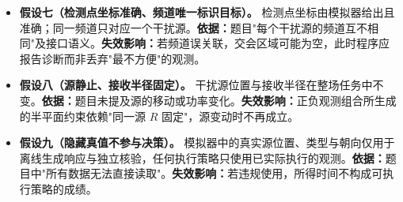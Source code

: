 \begin{itemize}[label=\textbullet,leftmargin=2em]
  \item \textbf{假设七（检测点坐标准确、频道唯一标识目标）。} 检测点坐标由模拟器给出且准确；同一频道只对应一个干扰源。\textbf{依据：}题目"每个干扰源的频道互不相同"及接口语义。\textbf{失效影响：}若频道误关联，交会区域可能为空，此时程序应报告诊断而非丢弃"最不方便"的观测。

  \item \textbf{假设八（源静止、接收半径固定）。} 干扰源位置与接收半径在整场任务中不变。\textbf{依据：}题目未提及源的移动或功率变化。\textbf{失效影响：}正负观测组合所生成的半平面约束依赖"同一源 $R$ 固定"，源变动时不再成立。

  \item \textbf{假设九（隐藏真值不参与决策）。} 模拟器中的真实源位置、类型与朝向仅用于离线生成响应与独立核验，任何执行策略只使用已实际执行的观测。\textbf{依据：}题目中"所有数据无法直接读取"。\textbf{失效影响：}若违规使用，所得时间不构成可执行策略的成绩。
\end{itemize}
